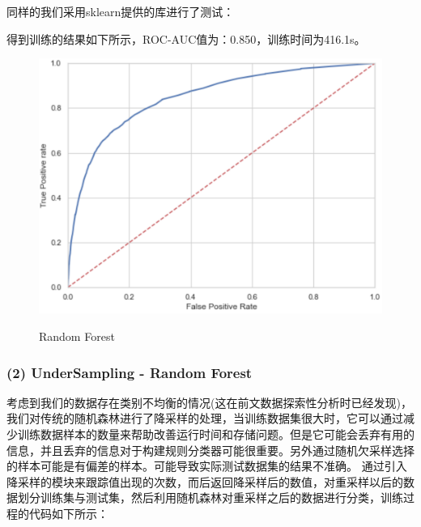 \documentclass{zjureport}
\begin{document}
        同样的我们采用sklearn提供的库进行了测试：

        
        
        得到训练的结果如下所示，ROC-AUC值为：0.850，训练时间为416.1s。
        \begin{figure}[H]
        \centering
        \includegraphics[scale=0.7]{figures/rf1.png}\\
        \caption{Random Forest}
        \end{figure}
        
        
        
        \subsubsection{(2) UnderSampling - Random Forest}
        
        考虑到我们的数据存在类别不均衡的情况(这在前文数据探索性分析时已经发现)，我们对传统的随机森林进行了降采样的处理，当训练数据集很大时，它可以通过减少训练数据样本的数量来帮助改善运行时间和存储问题。但是它可能会丢弃有用的信息，并且丢弃的信息对于构建规则分类器可能很重要。另外通过随机欠采样选择的样本可能是有偏差的样本。可能导致实际测试数据集的结果不准确。
        通过引入降采样的模块来跟踪值出现的次数，而后返回降采样后的数值，对重采样以后的数据划分训练集与测试集，然后利用随机森林对重采样之后的数据进行分类，训练过程的代码如下所示：
    
    
    
    
\end{document}
